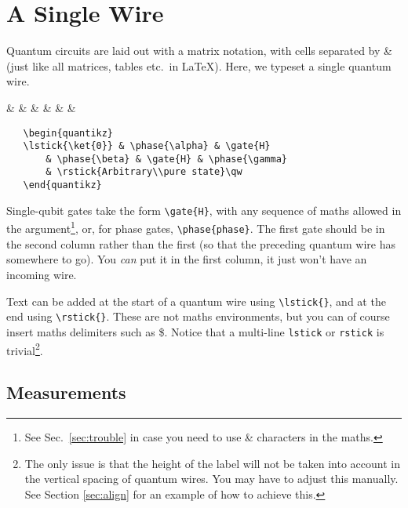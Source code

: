 \documentclass[aps,pra,10pt,nofootinbib]{revtex4}
\begin{document}
\section{A Single Wire}
Quantum circuits are laid out with a matrix notation, with cells separated by \& (just like all matrices, tables etc.\ in \LaTeX). Here, we typeset a single quantum wire.
\begin{Code}
\begin{center}
\begin{quantikz}
 & \phase{\alpha} &  & \phase{\beta} &  & \phase{\gamma} & \qw
\end{quantikz}
\end{center}
\tcblower
\begin{lstlisting}
   \begin{quantikz}
   \lstick{\ket{0}} & \phase{\alpha} & \gate{H} 
	   & \phase{\beta} & \gate{H} & \phase{\gamma}
	   & \rstick{Arbitrary\\pure state}\qw
   \end{quantikz}
\end{lstlisting}
\end{Code}
Single-qubit gates take the form \verb!\gate{H}!, with any sequence of maths allowed in the argument\footnote{See Sec.\ \ref{sec:trouble} in case you need to use \& characters in the maths.}, or, for phase gates, \verb!\phase{phase}!. The first gate should be in the second column rather than the first (so that the preceding quantum wire has somewhere to go). You {\em can} put it in the first column, it just won't have an incoming wire. 

Text can be added at the start of a quantum wire using \verb!\lstick{}!, and at the end using \verb!\rstick{}!. These are not maths environments, but you can of course insert maths delimiters such as \$.
Notice that a multi-line \verb!lstick! or \verb!rstick! is trivial\footnote{The only issue is that the height of the label will not be taken into account in the vertical spacing of quantum wires. You may have to adjust this manually. See Section \ref{sec:align} for an example of how to achieve this.}.

\subsection{Measurements}
\end{document}
